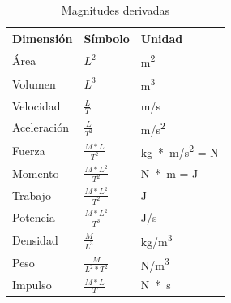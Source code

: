 \begin{table}[H]
\centering

\caption{Magnitudes derivadas}
\label{tab:magnitudes_derivadas}

\begin{threeparttable}{
\begin{tabular}{M{0.35\textwidth}M{0.25\textwidth}M{0.25\textwidth}} \hline

    \bfseries{Dimensión} & \textbf{Símbolo} & \textbf{Unidad} \\ \hline

    Área        & $L^2$               & \unit{m^{2}} \\ 
    Volumen     & $L^3$               & \unit{m^{3}} \\ 
    Velocidad   & $\frac{L}{T}$       & \unit{m/s} \\ 
    Aceleración & $\frac{L}{T^2}$     & \unit{m/s^{2}} \\ 
    Fuerza      & $\frac{M*L}{T^2}$   & \unit{kg*m/s^{2}} = \unit{\newton} \\ 
    Momento     & $\frac{M*L^2}{T^2}$ & \unit{\newton * m} = \unit{\joule} \\ 
    Trabajo     & $\frac{M*L^2}{T^2}$ & \unit{\joule} \\ 
    Potencia    & $\frac{M*L^2}{T^3}$ & \unit{\joule/s} \\ 
    Densidad    & $\frac{M}{L^3}$     & \unit{kg/m^{3}} \\ 
    Peso        & $\frac{M}{L^2*T^2}$ & \unit{\newton/m^{3}} \\ 
    Impulso     & $\frac{M*L}{T}$     & \unit{\newton * s} \\ 
    
    \hline
\end{tabular}}

\begin{tablenotes} %
    \item[] 
\end{tablenotes}

\end{threeparttable}\end{table}